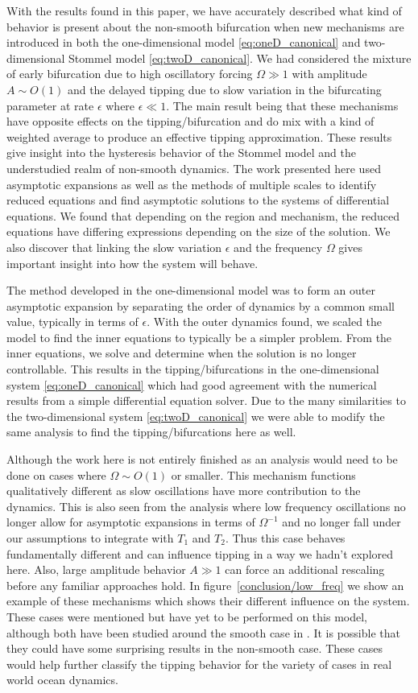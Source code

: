 With the results found in this paper, we have accurately described what kind of behavior is present about the non-smooth bifurcation when new mechanisms are introduced in both the one-dimensional model \eqref{eq:oneD_canonical} and two-dimensional Stommel model \eqref{eq:twoD_canonical}. We had considered the mixture of early bifurcation due to high oscillatory forcing $\Omega\gg 1$ with amplitude $A\sim O(1)$ and the delayed tipping due to slow variation in the bifurcating parameter at rate $\epsilon$ where $\epsilon \ll 1$. The main result being that these mechanisms have opposite effects on the tipping/bifurcation and do mix with a kind of weighted average to produce an effective tipping approximation. These results give insight into the hysteresis behavior of the Stommel model and the understudied realm of non-smooth dynamics. The work presented here used asymptotic expansions as well as the methods of multiple scales to identify reduced equations and find asymptotic solutions to the systems of differential equations. We found that depending on the region and mechanism, the reduced equations have differing expressions depending on the size of the solution. We also discover that linking the slow variation $\epsilon$ and the frequency $\Omega$ gives important insight into how the system will behave. 

The method developed in the one-dimensional model was to form an outer asymptotic expansion by separating the order of dynamics by a common small value, typically in terms of $\epsilon$. With the outer dynamics found, we scaled the model to find the inner equations to typically be a simpler problem. From the inner equations, we solve and determine when the solution is no longer controllable. This results in the tipping/bifurcations in the one-dimensional system \eqref{eq:oneD_canonical} which had good agreement with the numerical results from a simple differential equation solver. Due to the many similarities to the two-dimensional system \eqref{eq:twoD_canonical} we were able to modify the same analysis to find the tipping/bifurcations here as well.

Although the work here is not entirely finished as an analysis would need to be done on cases where $\Omega\sim O(1)$ or smaller. This mechanism functions qualitatively different as slow oscillations have more contribution to the dynamics. This is also seen from the analysis where low frequency oscillations no longer allow for asymptotic expansions in terms of $\Omega^{-1}$ and no longer fall under our assumptions to integrate with $T_1$ and $T_2$. Thus this case behaves fundamentally different and can influence tipping in a way we hadn't explored here. Also, large amplitude behavior $A\gg 1$ can force an additional rescaling before any familiar approaches hold. In figure~\ref{conclusion/low_freq} we show an example of these mechanisms which shows their different influence on the system. These cases were mentioned but have yet to be performed on this model, although both have been studied around the smooth case in \cite{zhu2015tipping}. It is possible that they could have some surprising results in the non-smooth case. These cases would help further classify the tipping behavior for the variety of cases in real world ocean dynamics.

